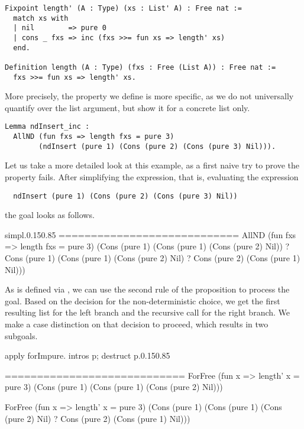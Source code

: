 \begin{verbatim}
Fixpoint length' (A : Type) (xs : List' A) : Free nat :=
  match xs with
  | nil        => pure 0
  | cons _ fxs => inc (fxs >>= fun xs => length' xs)
  end.

Definition length (A : Type) (fxs : Free (List A)) : Free nat :=
  fxs >>= fun xs => length' xs.
\end{verbatim}
  
More precisely, the property we define is more specific, as we do not universally quantify over the list argument, but show it for a concrete list only.

\begin{verbatim}
Lemma ndInsert_inc :
  AllND (fun fxs => length fxs = pure 3)
        (ndInsert (pure 1) (Cons (pure 2) (Cons (pure 3) Nil))).
\end{verbatim}

Let us take a more detailed look at this example, as a first naive try to prove the property fails.
After simplifying the expression, that is, evaluating the expression
\begin{verbatim}
  ndInsert (pure 1) (Cons (pure 2) (Cons (pure 3) Nil))
\end{verbatim}
the goal looks as follows.

\begin{cproof1}{simpl.}{0.15}{0.85}
  ============================
  AllND (fun fxs => length fxs = pure 3)
        (Cons (pure 1) (Cons (pure 1) (Cons (pure 2) Nil))
        ? Cons (pure 1) (Cons (pure 1) (Cons (pure 2) Nil)
        ? Cons (pure 2) (Cons (pure 1) Nil)))
\end{cproof1}

As  is defined via , we can use the second rule of the proposition to process the goal.
Based on the decision for the non\--deterministic choice, we get the first resulting list for the left branch and the recursive call for the right branch.
We make a case distinction on that decision to proceed, which results in two subgoals.

\begin{cproof1}{apply forImpure. intros p; destruct p.}{0.15}{0.85}

  ============================
  ForFree (fun x => length' x = pure 3)
          (Cons (pure 1) (Cons (pure 1) (Cons (pure 2) Nil)))

  ForFree (fun x => length' x = pure 3)
          (Cons (pure 1) (Cons (pure 1) (Cons (pure 2) Nil)
          ? Cons (pure 2) (Cons (pure 1) Nil)))
\end{cproof1}


